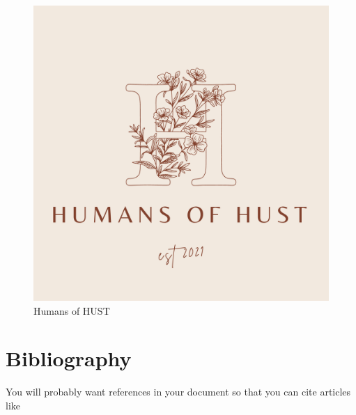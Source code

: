 \documentclass[15pt, a4paper]{article}
\begin{document}
    \begin{figure}[htp]
        \centering
        \includegraphics[scale = .5]{Avatar.png}
        \caption{Humans of HUST}
        \label{Humans of HUST}
        \end{figure}
    
    
    \section{Bibliography}
    You will probably want references in your document so that you can cite articles like \cite{frenkel_fine_2013, frenkel_optical_2013, frenkel_temperature_2012, frenkel_whispering-gallery_2013,frenkel_-chip_2016}
    
     
    
\end{document}

